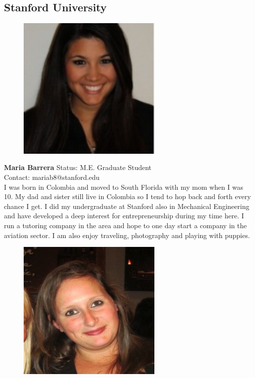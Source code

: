 \documentclass[a4paper, 12pt,conference]{new_cit_thesis}
\begin{document}
\subsection*{Stanford University}

\begin{figure}[h]
  \centering
     \includegraphics[width=7cm]{images/image011.jpg}
  \label{fig:11}
\end{figure}

\textbf{Maria Barrera}
Status: M.E. Graduate Student \\
Contact: mariab8@stanford.edu \\
I was born in Colombia and moved to South Florida with my mom when I was 10. My dad and sister still live in Colombia so I tend to hop back and forth every chance I get. I did my undergraduate at Stanford also in Mechanical Engineering and have developed a deep interest for entrepreneurship during my time here. I run a tutoring company in the area and hope to one day start a company in the aviation sector. I am also enjoy traveling, photography and playing with puppies.

\begin{figure}[h]
  \centering
     \includegraphics[width=7cm]{images/image012}
  \label{fig:12}
\end{figure}
\end{document}

